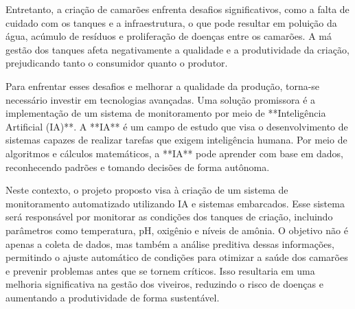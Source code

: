 Entretanto, a criação de camarões enfrenta desafios significativos, como a falta de cuidado com os tanques e a infraestrutura, o que pode resultar em poluição da água, acúmulo de resíduos e proliferação de doenças entre os camarões. A má gestão dos tanques afeta negativamente a qualidade e a produtividade da criação, prejudicando tanto o consumidor quanto o produtor.

Para enfrentar esses desafios e melhorar a qualidade da produção, torna-se necessário investir em tecnologias avançadas. Uma solução promissora é a implementação de um sistema de monitoramento por meio de **Inteligência Artificial (IA)**. A **IA** é um campo de estudo que visa o desenvolvimento de sistemas capazes de realizar tarefas que exigem inteligência humana. Por meio de algoritmos e cálculos matemáticos, a **IA** pode aprender com base em dados, reconhecendo padrões e tomando decisões de forma autônoma.

Neste contexto, o projeto proposto visa à criação de um sistema de monitoramento automatizado utilizando IA e sistemas embarcados. Esse sistema será responsável por monitorar as condições dos tanques de criação, incluindo parâmetros como temperatura, pH, oxigênio e níveis de amônia. O objetivo não é apenas a coleta de dados, mas também a análise preditiva dessas informações, permitindo o ajuste automático de condições para otimizar a saúde dos camarões e prevenir problemas antes que se tornem críticos. Isso resultaria em uma melhoria significativa na gestão dos viveiros, reduzindo o risco de doenças e aumentando a produtividade de forma sustentável.
